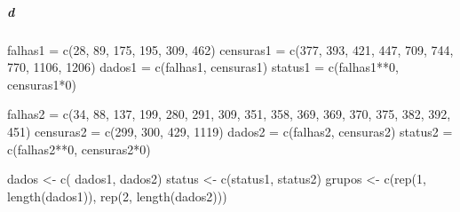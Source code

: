 \documentclass[
]{article}
\newenvironment{Shaded}{\begin{snugshade}}{\end{snugshade}}
\newcommand{\DecValTok}[1]{\textcolor[rgb]{0.00,0.00,0.81}{#1}}
\newcommand{\FunctionTok}[1]{\textcolor[rgb]{0.00,0.00,0.00}{#1}}
\newcommand{\NormalTok}[1]{#1}
\newcommand{\OtherTok}[1]{\textcolor[rgb]{0.56,0.35,0.01}{#1}}
\newcommand{\SpecialCharTok}[1]{\textcolor[rgb]{0.00,0.00,0.00}{#1}}
\begin{document}
\hypertarget{d-3}{%
\subparagraph{d}\label{d-3}}

\hspace{2 pt}

\begin{Shaded}
\begin{Highlighting}[]
\NormalTok{falhas1   }\OtherTok{=} \FunctionTok{c}\NormalTok{(}\DecValTok{28}\NormalTok{, }\DecValTok{89}\NormalTok{, }\DecValTok{175}\NormalTok{, }\DecValTok{195}\NormalTok{, }\DecValTok{309}\NormalTok{, }\DecValTok{462}\NormalTok{)}
\NormalTok{censuras1 }\OtherTok{=} \FunctionTok{c}\NormalTok{(}\DecValTok{377}\NormalTok{, }\DecValTok{393}\NormalTok{, }\DecValTok{421}\NormalTok{, }\DecValTok{447}\NormalTok{, }\DecValTok{709}\NormalTok{, }\DecValTok{744}\NormalTok{, }\DecValTok{770}\NormalTok{, }\DecValTok{1106}\NormalTok{, }\DecValTok{1206}\NormalTok{)}
\NormalTok{dados1    }\OtherTok{=} \FunctionTok{c}\NormalTok{(falhas1,    censuras1)}
\NormalTok{status1   }\OtherTok{=} \FunctionTok{c}\NormalTok{(falhas1}\SpecialCharTok{**}\DecValTok{0}\NormalTok{, censuras1}\SpecialCharTok{*}\DecValTok{0}\NormalTok{)}

\NormalTok{falhas2   }\OtherTok{=} \FunctionTok{c}\NormalTok{(}\DecValTok{34}\NormalTok{, }\DecValTok{88}\NormalTok{, }\DecValTok{137}\NormalTok{, }\DecValTok{199}\NormalTok{, }\DecValTok{280}\NormalTok{,}
              \DecValTok{291}\NormalTok{, }\DecValTok{309}\NormalTok{, }\DecValTok{351}\NormalTok{, }\DecValTok{358}\NormalTok{, }\DecValTok{369}\NormalTok{,}
              \DecValTok{369}\NormalTok{, }\DecValTok{370}\NormalTok{, }\DecValTok{375}\NormalTok{, }\DecValTok{382}\NormalTok{, }\DecValTok{392}\NormalTok{,}
              \DecValTok{451}\NormalTok{)}
\NormalTok{censuras2 }\OtherTok{=} \FunctionTok{c}\NormalTok{(}\DecValTok{299}\NormalTok{, }\DecValTok{300}\NormalTok{, }\DecValTok{429}\NormalTok{, }\DecValTok{1119}\NormalTok{)}
\NormalTok{dados2    }\OtherTok{=} \FunctionTok{c}\NormalTok{(falhas2,    censuras2)}
\NormalTok{status2   }\OtherTok{=} \FunctionTok{c}\NormalTok{(falhas2}\SpecialCharTok{**}\DecValTok{0}\NormalTok{, censuras2}\SpecialCharTok{*}\DecValTok{0}\NormalTok{)}

\NormalTok{dados  }\OtherTok{\textless{}{-}} \FunctionTok{c}\NormalTok{( dados1,  dados2)}
\NormalTok{status }\OtherTok{\textless{}{-}} \FunctionTok{c}\NormalTok{(status1, status2)}
\NormalTok{grupos }\OtherTok{\textless{}{-}} \FunctionTok{c}\NormalTok{(}\FunctionTok{rep}\NormalTok{(}\DecValTok{1}\NormalTok{, }\FunctionTok{length}\NormalTok{(dados1)), }\FunctionTok{rep}\NormalTok{(}\DecValTok{2}\NormalTok{, }\FunctionTok{length}\NormalTok{(dados2)))}


\end{Highlighting}
\end{Shaded}
\end{document}
